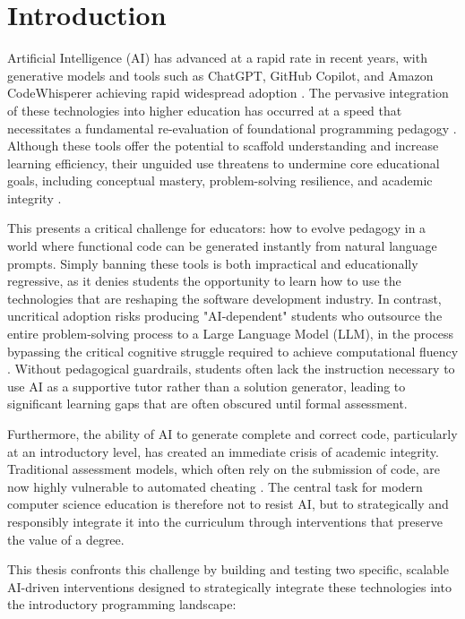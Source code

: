 \chapter{Introduction}\label{ch:intro}

Artificial Intelligence (AI) has advanced at a rapid rate in recent years, with generative models and tools such as ChatGPT, GitHub Copilot, and Amazon CodeWhisperer achieving rapid widespread adoption \cite{chatgpt_growth_2023}. The pervasive integration of these technologies into higher education has occurred at a speed that necessitates a fundamental re-evaluation of foundational programming pedagogy \cite{Alpizar-Chacon2025}. Although these tools offer the potential to scaffold understanding and increase learning efficiency, their unguided use threatens to undermine core educational goals, including conceptual mastery, problem-solving resilience, and academic integrity \cite{Becker}.

This presents a critical challenge for educators: how to evolve pedagogy in a world where functional code can be generated instantly from natural language prompts. Simply banning these tools is both impractical and educationally regressive, as it denies students the opportunity to learn how to use the technologies that are reshaping the software development industry. In contrast, uncritical adoption risks producing "AI-dependent" students who outsource the entire problem-solving process to a Large Language Model (LLM), in the process bypassing the critical cognitive struggle required to achieve computational fluency \cite{Bassner2026}. Without pedagogical guardrails, students often lack the instruction necessary to use AI as a supportive tutor rather than a solution generator, leading to significant learning gaps that are often obscured until formal assessment.

Furthermore, the ability of AI to generate complete and correct code, particularly at an introductory level, has created an immediate crisis of academic integrity. Traditional assessment models, which often rely on the submission of code, are now highly vulnerable to automated cheating \cite{Lau2023}. The central task for modern computer science education is therefore not to resist AI, but to strategically and responsibly integrate it into the curriculum through interventions that preserve the value of a degree.

This thesis confronts this challenge by building and testing two specific, scalable AI-driven interventions designed to strategically integrate these technologies into the introductory programming landscape:

